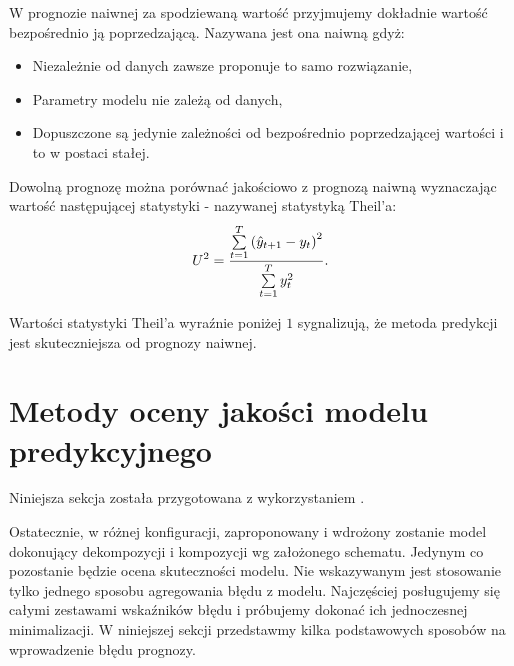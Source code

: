 \documentclass[10pt,a4paper]{book}
\begin{document}
W prognozie naiwnej za spodziewaną wartość przyjmujemy dokładnie wartość bezpośrednio ją poprzedzającą. Nazywana jest ona naiwną gdyż:
\begin{itemize}
\item Niezależnie od danych zawsze proponuje to samo rozwiązanie,
\item Parametry modelu nie zależą od danych,
\item Dopuszczone są jedynie zależności od bezpośrednio poprzedzającej wartości i to w postaci stałej.
\end{itemize}

\begin{definition}
Dowolną prognozę można porównać jakościowo z prognozą naiwną wyznaczając wartość następującej statystyki - nazywanej statystyką Theil'a:
$$
U^2 = \frac{\sum_{t = 1}^{T} \bracket{\predict{y}{t+1} - y_t }^2}{\sum_{t=1}^{T} y_t^2}.
$$
\end{definition}
Wartości statystyki Theil'a wyraźnie poniżej $1$ sygnalizują, że metoda predykcji jest skuteczniejsza od prognozy naiwnej.

\section{Metody oceny jakości modelu predykcyjnego}

Niniejsza sekcja została przygotowana z wykorzystaniem \citep{montgomery2015introduction}.

Ostatecznie, w różnej konfiguracji, zaproponowany i wdrożony zostanie model dokonujący dekompozycji i kompozycji wg założonego schematu. Jedynym co pozostanie będzie ocena skuteczności modelu. Nie wskazywanym jest stosowanie tylko jednego sposobu agregowania błędu z modelu. Najczęściej posługujemy się całymi zestawami wskaźników błędu i próbujemy dokonać ich jednoczesnej minimalizacji. W niniejszej sekcji przedstawmy kilka podstawowych sposobów na wprowadzenie błędu prognozy.
\end{document}
